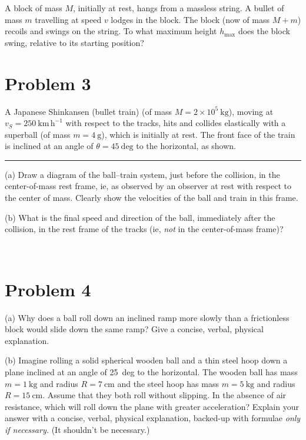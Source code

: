 \documentclass[12pt]{article}
\begin{document}
A block of mass $M$, initially at rest, hangs from a massless string.
A bullet of mass $m$ travelling at speed $v$ lodges in the block.  The
block (now of mass $M+m$) recoils and swings on the string.  To what
maximum height $h_\mathrm{max}$ does the block swing, relative to its
starting position?

\clearpage

\section*{Problem 3}

A Japanese Shinkansen (bullet train) (of mass $M=2\times
10^5~\mathrm{kg}$), moving at $v_S=250~\mathrm{km\,h^{-1}}$ with
respect to the tracks, hits and collides elastically with a superball
(of mass $m=4~\mathrm{g}$), which is initially at rest.  The front
face of the train is inclined at an angle of $\theta=45~\mathrm{deg}$
to the horizontal, as shown.
\\ \rule{0.1\textwidth}{0pt}

(a) Draw a diagram of the ball--train system, just before the
collision, in the center-of-mass rest frame, ie, as observed by an
observer at rest with respect to the center of mass.  Clearly show the
velocities of the ball and train in this frame.

\vfill

(b) What is the final speed and direction of the ball, immediately
after the collision, in the rest frame of the tracks (ie, \emph{not}
in the center-of-mass frame)?

\vfill ~

\clearpage

\section*{Problem 4}

(a) Why does a ball roll down an inclined ramp more slowly than a
frictionless block would slide down the same ramp?  Give a concise,
verbal, physical explanation.

\vfill

(b) Imagine rolling a solid spherical wooden ball and a thin steel
hoop down a plane inclined at an angle of 25~deg to the horizontal.
The wooden ball has mass $m=1~\mathrm{kg}$ and radius
$R=7~\mathrm{cm}$ and the steel hoop has mass $m=5~\mathrm{kg}$ and
radius $R=15~\mathrm{cm}$.  Assume that they both roll without
slipping.  In the absence of air resistance, which will roll down the
plane with greater acceleration?  Explain your answer with a concise,
verbal, physical explanation, backed-up with formulae \emph{only if
necessary.}  (It shouldn't be necessary.)
\end{document}
